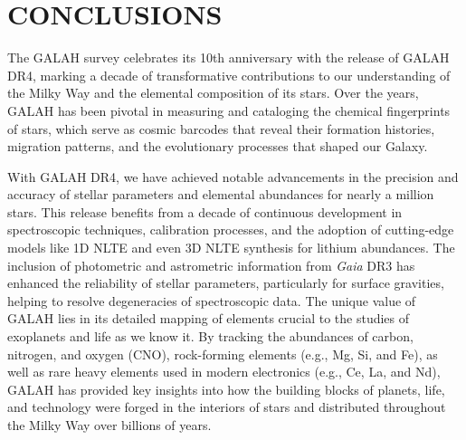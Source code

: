 \documentclass[
  journal=pasa,
  manuscript=research-paper, %
  year=2024,
  volume=37
]{cup-journal}
\newcommand{\Gaia}{\textit{Gaia}\xspace}
\begin{document}
\section{CONCLUSIONS}
\label{sec:conclusion}

The GALAH survey celebrates its 10th anniversary with the release of GALAH DR4, marking a decade of transformative contributions to our understanding of the Milky Way and the elemental composition of its stars. Over the years, GALAH has been pivotal in measuring and cataloging the chemical fingerprints of stars, which serve as cosmic barcodes that reveal their formation histories, migration patterns, and the evolutionary processes that shaped our Galaxy.

With GALAH DR4, we have achieved notable advancements in the precision and accuracy of stellar parameters and elemental abundances for nearly a million stars. This release benefits from a decade of continuous development in spectroscopic techniques, calibration processes, and the adoption of cutting-edge models like 1D NLTE and even 3D NLTE synthesis for lithium abundances. The inclusion of photometric and astrometric information from \Gaia DR3 has enhanced the reliability of stellar parameters, particularly for surface gravities, helping to resolve degeneracies of spectroscopic data. The unique value of GALAH lies in its detailed mapping of elements crucial to the studies of exoplanets and life as we know it. By tracking the abundances of carbon, nitrogen, and oxygen (CNO), rock-forming elements (e.g., Mg, Si, and Fe), as well as rare heavy elements used in modern electronics (e.g., Ce, La, and Nd), GALAH has provided key insights into how the building blocks of planets, life, and technology were forged in the interiors of stars and distributed throughout the Milky Way over billions of years.
\end{document}
